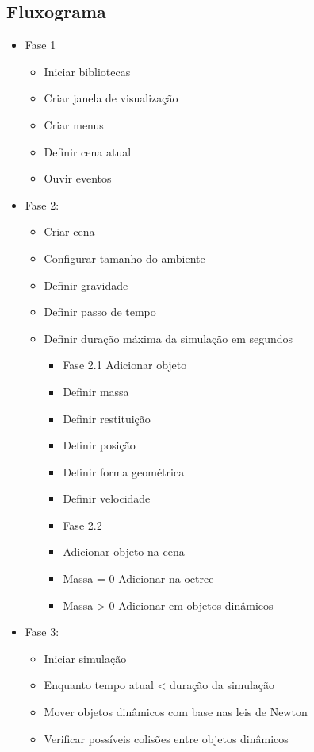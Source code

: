 \subsection{Fluxograma}
\begin{itemize}
\item Fase 1
\begin{itemize}
\item Iniciar bibliotecas
\item Criar janela de visualização
\item Criar menus
\item Definir cena atual
\item Ouvir eventos
\end{itemize}
\item Fase 2:
\begin{itemize}
\item Criar cena
\item Configurar tamanho do ambiente
\item Definir gravidade
\item Definir passo de tempo
\item Definir duração máxima da simulação em segundos
\begin{itemize}
\item Fase 2.1
Adicionar objeto
\item Definir massa
\item Definir restituição
\item Definir posição
\item Definir forma geométrica
\item Definir velocidade
\end{itemize}
\begin{itemize}
\item Fase 2.2
\item Adicionar objeto na cena
\item Massa = 0 Adicionar na octree
\item Massa > 0 Adicionar em objetos dinâmicos
\end{itemize}
\end{itemize}
\item Fase 3:
\begin{itemize}
\item Iniciar simulação
\item Enquanto tempo atual < duração da simulação
\item Mover objetos dinâmicos com base nas leis de Newton
\item Verificar possíveis colisões entre objetos dinâmicos

\end{itemize}
\end{itemize}
